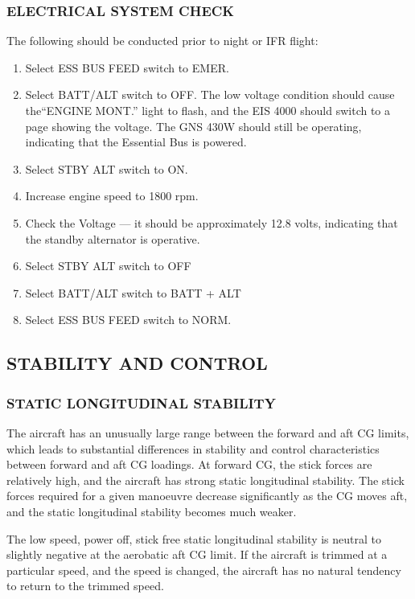   \subsubsection{ELECTRICAL SYSTEM CHECK}
  The following should be conducted prior to night or IFR flight:
  \begin{enumerate}
    \item Select ESS BUS FEED switch to EMER.
    \item Select BATT/ALT switch to OFF. The low voltage condition should cause the``ENGINE MONT.'' light to flash, and the EIS 4000 should switch to a page showing the voltage. The GNS 430W should still be operating, indicating that the Essential Bus is powered.
    \item Select STBY ALT switch to ON. 
    \item Increase engine speed to 1800 rpm.
    \item Check the Voltage --- it should be approximately 12.8 volts, indicating that the standby alternator is operative.
    \item Select STBY ALT switch to OFF
    \item Select BATT/ALT switch to BATT + ALT
    \item Select ESS BUS FEED switch to NORM.
    \end{enumerate}
  
\subsection{STABILITY AND CONTROL}
  \subsubsection{STATIC LONGITUDINAL STABILITY}
  The aircraft has an unusually large range between the forward and aft CG limits, which leads to substantial differences in stability and control characteristics between forward and aft CG loadings. At forward CG, the stick forces are relatively high, and the aircraft has strong static longitudinal stability. The stick forces required for a given manoeuvre decrease significantly as the CG moves aft, and the static longitudinal stability becomes much weaker. 
  
The low speed, power off, stick free static longitudinal stability is neutral to slightly negative at the aerobatic aft CG limit. If the aircraft is trimmed at a particular speed, and the speed is changed, the aircraft has no natural tendency to return to the trimmed speed. 
 
